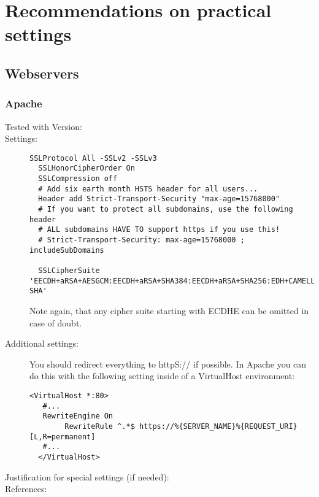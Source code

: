 \section{Recommendations on practical settings}


\subsection{Webservers}

\subsubsection{Apache}

\begin{description}
\item[Tested with Version:]

\item[Settings:] \mbox{}

\begin{lstlisting}[breaklines]
  SSLProtocol All -SSLv2 -SSLv3 
  SSLHonorCipherOrder On
  SSLCompression off
  # Add six earth month HSTS header for all users...
  Header add Strict-Transport-Security "max-age=15768000"
  # If you want to protect all subdomains, use the following header
  # ALL subdomains HAVE TO support https if you use this!
  # Strict-Transport-Security: max-age=15768000 ; includeSubDomains

  SSLCipherSuite 'EECDH+aRSA+AESGCM:EECDH+aRSA+SHA384:EECDH+aRSA+SHA256:EDH+CAMELLIA256:EECDH:EDH+aRSA:+SSLv3:!aNULL:!eNULL:!LOW:!3DES:!MD5:!EXP:!PSK:!SRP:!DSS:!RC4:!SEED:!AES128:!CAMELLIA128:!ECDSA:AES256-SHA'
\end{lstlisting}

Note again, that any cipher suite starting with ECDHE  can be omitted in case of doubt.

\item[Additional settings:]

You should redirect everything to httpS:// if possible. In Apache you can do this with the following setting inside of a VirtualHost environment:

\begin{lstlisting}[breaklines]
  <VirtualHost *:80>
   #...
   RewriteEngine On
        RewriteRule ^.*$ https://%{SERVER_NAME}%{REQUEST_URI} [L,R=permanent]
   #...
  </VirtualHost>
\end{lstlisting}

\item[Justification for special settings (if needed):]

\item[References:]

\end{description}


